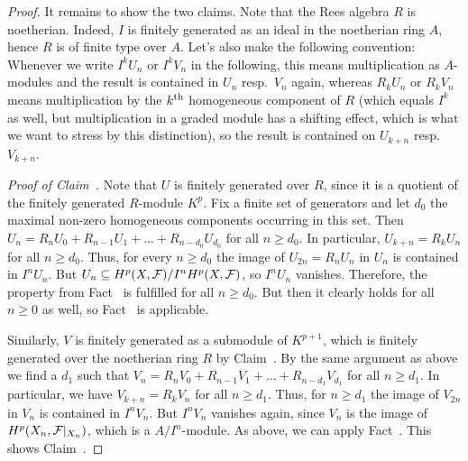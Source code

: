 \documentclass[a4paper,parskip=half,numbers=enddot, DIV=12]{scrreprt}
\renewcommand{\geq}{\geqslant}
\begin{document}
\begin{proof}
	It remains to show the two claims. Note that the Rees algebra $R$ is noetherian. Indeed, $I$ is finitely generated as an ideal in the noetherian ring $A$, hence $R$ is of finite type over $A$. Let's also make the following convention: Whenever we write $I^kU_n$ or $I^kV_n$ in the following, this means multiplication as $A$-modules and the result is contained in $U_n$ resp.\ $V_n$ again, whereas $R_kU_n$ or $R_kV_n$ means multiplication by the $k^{\text{th}}$ homogeneous component of $R$ (which equals $I^k$ as well, but multiplication in a graded module has a shifting effect, which is what we want to stress by this distinction), so the result is contained on $U_{k+n}$ resp.\ $V_{k+n}$.
	
	\emph{Proof of Claim~.} Note that $U$ is finitely generated over $R$, since it is a quotient of the finitely generated $R$-module $K^p$. Fix a finite set of generators and let $d_0$ the maximal non-zero homogeneous components occurring in this set. Then $U_n=R_nU_0+R_{n-1}U_1+\ldots+R_{n-d_0}U_{d_0}$ for all $n\geq d_0$. In particular, $U_{k+n}=R_kU_n$ for all $n\geq d_0$. Thus, for every $n\geq d_0$ the image of $U_{2n}=R_nU_n$ in $U_n$ is contained in $I^nU_n$. But $U_n\subseteq H^p(X,\mathcal{F})/I^nH^p(X,\mathcal{F})$, so $I^nU_n$ vanishes. Therefore, the property from Fact~ is fulfilled for all $n\geq d_0$. But then it clearly holds for all $n\geq 0$ as well, so Fact~ is applicable.
	
	Similarly, $V$ is finitely generated as a submodule of $K^{p+1}$, which is finitely generated over the noetherian ring $R$ by Claim~. By the same argument as above we find a $d_1$ such that $V_n=R_nV_0+R_{n-1}V_1+\ldots+R_{n-d_1}V_{d_1}$ for all $n\geqslant d_1$. In particular, we have $V_{k+n}=R_kV_n$ for all $n\geq d_1$. Thus, for $n\geq d_1$ the image of $V_{2n}$ in $V_n$ is contained in $I^nV_n$. But $I^nV_n$ vanishes again, since $V_n$ is the image of $H^p(X_n,\mathcal{F}|_{X_n})$, which is a $A/I^n$-module. As above, we can apply Fact~. This shows Claim~.
	

\end{proof}
\end{document}
